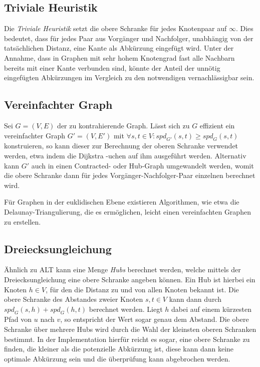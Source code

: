 \subsection{Triviale Heuristik}

Die \emph{Triviale Heuristik} setzt die obere Schranke für jedes Knotenpaar auf $\infty$.
Dies bedeutet, dass für jedes Paar aus Vorgänger und Nachfolger, unabhängig von der tatsächlichen Distanz, eine Kante als Abkürzung eingefügt wird.
Unter der Annahme, dass in Graphen mit sehr hohem Knotengrad fast alle Nachbarn bereits mit einer Kante verbunden sind, könnte der Anteil der unnötig eingefügten Abkürzungen im Vergleich zu den notwendigen vernachlässigbar sein.

\subsection{Vereinfachter Graph}

Sei $G = (V, E)$ der zu kontrahierende Graph.
Lässt sich zu $G$ effizient ein vereinfachter Graph $G' = (V, E')$ mit $\forall s, t \in V \colon {spd}_{G'} (s, t) \geq {spd}_{G} (s, t)$ konstruieren, so kann dieser zur Berechnung der oberen Schranke verwendet werden, etwa indem die Dijkstra -uchen auf ihm ausgeführt werden.
Alternativ kann $G'$ auch in einen Contracted- oder Hub-Graph umgewandelt werden, womit die obere Schranke dann für jedes Vorgänger-Nachfolger-Paar einzelnen berechnet wird.

Für Graphen in der euklidischen Ebene existieren Algorithmen, wie etwa die Delaunay-Triangulierung, die es ermöglichen, leicht einen vereinfachten Graphen zu erstellen.

\subsection{Dreiecksungleichung}

Ähnlich zu ALT\cite{goldberg2005computing} kann eine Menge \emph{Hubs} berechnet werden, welche mittels der Dreiecksungleichung eine obere Schranke angeben können.
Ein Hub ist hierbei ein Knoten $h \in V$, für den die Distanz zu und von allen Knoten bekannt ist.
Die obere Schranke des Abstandes zweier Knoten $s, t \in V$ kann dann durch ${spd}_G (s, h) + {spd}_G (h, t)$ berechnet werden.
Liegt $h$ dabei auf einem kürzesten Pfad von $u$ nach $v$, so entspricht der Wert sogar genau dem Abstand.
Die obere Schranke über mehrere Hubs wird durch die Wahl der kleinsten oberen Schranken bestimmt.
In der Implementation hierfür reicht es sogar, eine obere Schranke zu finden, die kleiner als die potenzielle Abkürzung ist, diese kann dann keine optimale Abkürzung sein und die überprüfung kann abgebrochen werden.

